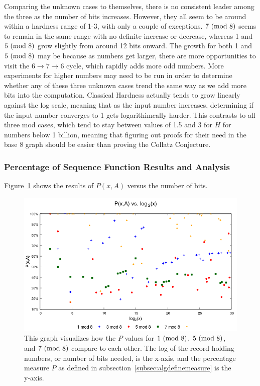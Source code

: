 Comparing the unknown cases to themselves, there is no consistent leader among the three as the number of bits increases. However, they all seem to be around within a hardness range of 1-3, with only a couple of exceptions. $7 \ (\mathrm{mod}\ 8)$ seems to remain in the same range with no definite increase or decrease, whereas 1 and $5 \ (\mathrm{mod}\ 8)$ grow slightly from around 12 bits onward. The growth for both 1 and $5 \ (\mathrm{mod}\ 8)$ may be because as numbers get larger, there are more opportunities to visit the $6 \rightarrow 7 \rightarrow 6$ cycle, which rapidly adds more odd numbers. More experiments for higher numbers may need to be run in order to determine whether any of these three unknown cases trend the same way as we add more bits into the computation.
Classical Hardness actually tends to grow linearly against the log scale, meaning that as the input number increases, determining if the input number converges to 1 gets logarithimcally harder. This contrasts to all three mod cases, which tend to stay between values of 1.5 and 3 for $H$ for numbers below 1 billion, meaning that figuring out proofs for their need in the base 8 graph should be easier than proving the Collatz Conjecture.
\subsubsection{Percentage of Sequence Function Results and Analysis} \label{subsubsec:algsinpercentage}
 Figure~\ref{fig:pvslog} shows the results of $P(x,A)$ versus the number of bits.\par 
\begin{figure}
    \centering
    \includegraphics[scale=0.75]{ModAvoidanceAnalysisPics/P_vs_log.png}
    \caption{This graph visualizes how the $P$ values for $1 \ (\mathrm{mod}\ 8)$, $5 \ (\mathrm{mod}\ 8)$, and $7 \ (\mathrm{mod}\ 8)$ compare to each other. The log of the record holding numbers, or number of bits needed, is the x-axis, and the percentage measure $P$ as defined in subsection~\ref{subsec:algdefinemeasure} is the y-axis.}
    \label{fig:pvslog}
\end{figure}

